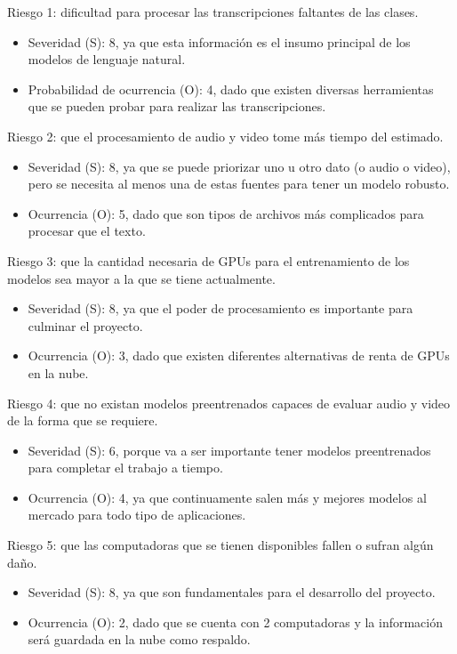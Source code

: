 \documentclass[
11pt, %
codirector, %
]{charter}
\begin{document}
Riesgo 1: dificultad para procesar las transcripciones faltantes de las clases.
\begin{itemize}
	\item Severidad (S): 8, ya que esta información es el insumo principal de los modelos de lenguaje natural.
	\item Probabilidad de ocurrencia (O): 4, dado que existen diversas herramientas que se pueden probar para realizar las transcripciones.
\end{itemize}   

Riesgo 2: que el procesamiento de audio y video tome más tiempo del estimado.
\begin{itemize}
	\item Severidad (S): 8, ya que se puede priorizar uno u otro dato (o audio o video), pero se necesita al menos una de estas fuentes para tener un modelo robusto.
	\item Ocurrencia (O): 5, dado que son tipos de archivos más complicados para procesar que el texto.
\end{itemize}

Riesgo 3: que la cantidad necesaria de GPUs para el entrenamiento de los modelos sea mayor a la que se tiene actualmente.
\begin{itemize}
	\item Severidad (S): 8, ya que el poder de procesamiento es importante para culminar el proyecto.
	\item Ocurrencia (O): 3, dado que existen diferentes alternativas de renta de GPUs en la nube.
\end{itemize}

Riesgo 4: que no existan modelos preentrenados capaces de evaluar audio y video de la forma que se requiere.
\begin{itemize}
	\item Severidad (S): 6, porque va a ser importante tener modelos preentrenados para completar el trabajo a tiempo.
	\item Ocurrencia (O): 4, ya que continuamente salen más y mejores modelos al mercado para todo tipo de aplicaciones.
\end{itemize}

Riesgo 5: que las computadoras que se tienen disponibles fallen o sufran algún daño.
\begin{itemize}
	\item Severidad (S): 8, ya que son fundamentales para el desarrollo del proyecto.
	\item Ocurrencia (O): 2, dado que se cuenta con 2 computadoras y la información será guardada en la nube como respaldo.
\end{itemize}
\end{document}
